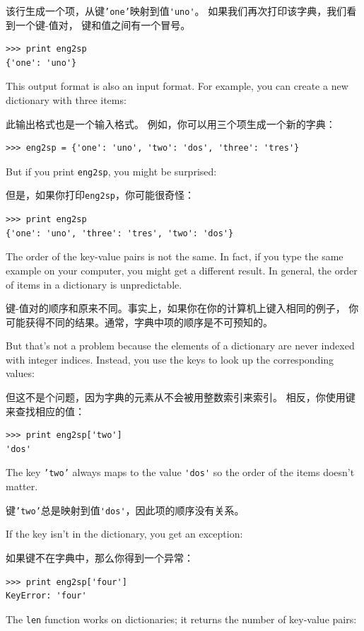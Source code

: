 \documentclass[10pt]{book}
\begin{document}
\begin{CJK}{UTF8}{gbsn}
该行生成一个项，从键{\tt 'one'}映射到值\verb"'uno'"。
如果我们再次打印该字典，我们看到一个键-值对，
键和值之间有一个冒号。

\begin{verbatim}
>>> print eng2sp
{'one': 'uno'}
\end{verbatim}
%
This output format is also an input format.  For example,
you can create a new dictionary with three items:

此输出格式也是一个输入格式。
例如，你可以用三个项生成一个新的字典：

\begin{verbatim}
>>> eng2sp = {'one': 'uno', 'two': 'dos', 'three': 'tres'}
\end{verbatim}
%
But if you print {\tt eng2sp}, you might be surprised:

但是，如果你打印{\tt eng2sp}，你可能很奇怪：

\begin{verbatim}
>>> print eng2sp
{'one': 'uno', 'three': 'tres', 'two': 'dos'}
\end{verbatim}
%
The order of the key-value pairs is not the same.  In fact, if
you type the same example on your computer, you might get a
different result.  In general, the order of items in
a dictionary is unpredictable.

键-值对的顺序和原来不同。事实上，如果你在你的计算机上键入相同的例子，
你可能获得不同的结果。通常，字典中项的顺序是不可预知的。

But that's not a problem because
the elements of a dictionary are never indexed with integer indices.
Instead, you use the keys to look up the corresponding values:

但这不是个问题，因为字典的元素从不会被用整数索引来索引。
相反，你使用键来查找相应的值：

\begin{verbatim}
>>> print eng2sp['two']
'dos'
\end{verbatim}
%
The key {\tt 'two'} always maps to the value \verb"'dos'" so the order
of the items doesn't matter.

键{\tt 'two'}总是映射到值\verb"'dos'"，因此项的顺序没有关系。

If the key isn't in the dictionary, you get an exception:

如果键不在字典中，那么你得到一个异常：

\begin{verbatim}
>>> print eng2sp['four']
KeyError: 'four'
\end{verbatim}
%
The {\tt len} function works on dictionaries; it returns the
number of key-value pairs:


\end{CJK}
\end{document}
